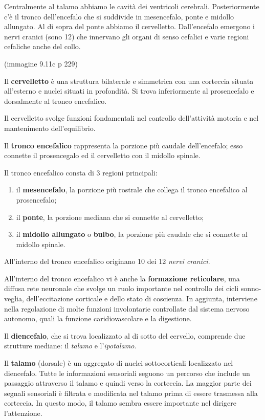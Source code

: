 \documentclass[]{article}
\begin{document}
Centralmente al talamo abbiamo le cavità dei ventricoli cerebrali.
Posteriormente c'è il tronco dell'encefalo che si suddivide in
mesencefalo, ponte e midollo allungato. Al di sopra del ponte abbiamo il
cervelletto. Dall'encefalo emergono i nervi cranici (sono 12) che
innervano gli organi di senso cefalici e varie regioni cefaliche anche
del collo.

(immagine 9.11c p 229)

Il \textbf{cervelletto} è una struttura bilaterale e simmetrica con una
corteccia situata all'esterno e nuclei situati in profondità. Si trova
inferiormente al prosencefalo e dorsalmente al tronco encefalico.

Il cervelletto svolge funzioni fondamentali nel controllo dell'attività
motoria e nel mantenimento dell'equilibrio.

Il \textbf{tronco encefalico} rappresenta la porzione più caudale
dell'encefalo; esso connette il prosencegalo ed il cervelletto con il
midollo spinale.

Il tronco encefalico consta di 3 regioni principali:

\begin{enumerate}
\def\labelenumi{\arabic{enumi}.}
\itemsep1pt\parskip0pt
\item
  il \textbf{mesencefalo}, la porzione più rostrale che collega il
  tronco encefalico al prosencefalo;
\item
  il \textbf{ponte}, la porzione mediana che si connette al cervelletto;
\item
  il \textbf{midollo allungato} o \textbf{bulbo}, la porzione più
  caudale che si connette al midollo spinale.
\end{enumerate}

All'interno del tronco encefalico originano 10 dei 12 \emph{nervi
cranici}.

All'interno del tronco encefalico vi è anche la \textbf{formazione
reticolare}, una diffusa rete neuronale che svolge un ruolo importante
nel controllo dei cicli sonno-veglia, dell'eccitazione corticale e dello
stato di coscienza. In aggiunta, interviene nella regolazione di molte
funzioni involontarie controllate dal sistema nervoso autonomo, quali la
funzione caridiovascolare e la digestione.

Il \textbf{diencefalo}, che si trova localizzato al di sotto del
cervello, comprende due strutture mediane: il \emph{talamo} e
l'\emph{ipotalamo}.

Il \textbf{talamo} (dorsale) è un aggregato di nuclei sottocorticali
localizzato nel diencefalo. Tutte le informazioni sensoriali seguono un
percorso che include un passaggio attraverso il talamo e quindi verso la
corteccia. La maggior parte dei segnali sensoriali è filtrata e
modificata nel talamo prima di essere trasmessa alla corteccia. In
questo modo, il talamo sembra essere importante nel dirigere
l'attenzione.
\end{document}
